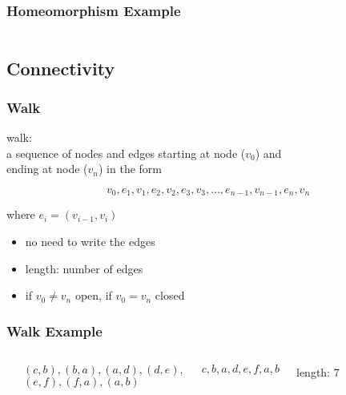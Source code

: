 \documentclass[dvipsnames]{beamer}
\begin{document}
\begin{frame}
  \frametitle{Homeomorphism Example}

  \begin{example}
    \begin{columns}
      \begin{center}
      \end{center}

      \begin{center}
      \end{center}
    \end{columns}
  \end{example}
\end{frame}

\subsection{Connectivity}

\begin{frame}
  \frametitle{Walk}

  \begin{definition}
    \alert{walk}:\\
    a sequence of nodes and edges starting at node ($v_0$) and\\
    ending at node ($v_n$) in the form

    \[
      v_0,e_1,v_1,e_2,v_2,e_3,v_3,\dots,e_{n-1},v_{n-1},e_n,v_n
    \]

    where $e_i=(v_{i-1},v_i)$
  \end{definition}

  \pause
  \begin{itemize}
    \item no need to write the edges

    \pause
    \medskip
    \item \alert{length}: number of edges
    \item if $v_0 \neq v_n$ \alert{open}, if $v_0 = v_n$ \alert{closed}
  \end{itemize}
\end{frame}

\begin{frame}
  \frametitle{Walk Example}

  \begin{example}
    \begin{columns}
      \begin{center}
      \end{center}

      $(c,b),(b,a),(a,d),(d,e),$\\
      $(e,f),(f,a),(a,b)$

      \medskip
      $c,b,a,d,e,f,a,b$

      \bigskip
      length: 7
    \end{columns}
  \end{example}
\end{frame}
\end{document}
